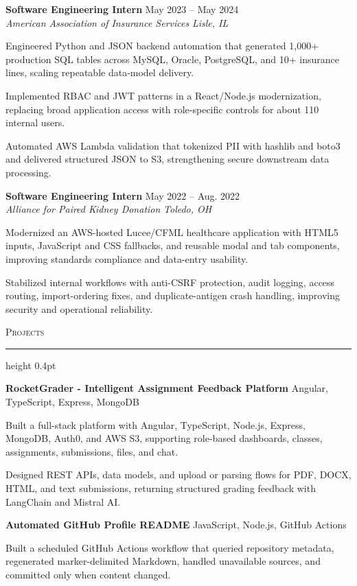 \documentclass[letterpaper,11pt]{article}
\newcommand{\resumesection}[1]{%
  \par\vspace{2pt}%
  {\large\scshape #1}\par\vspace{2pt}%
  \hrule height 0.4pt\vspace{2pt}%
}
\newcommand{\resumeSubheading}[4]{
  \textbf{#1} \hfill #2\\
  \textit{#3} \hfill \textit{#4}
}
\newcommand{\projectHeading}[2]{
  \textbf{#1} \hfill #2
}
\begin{document}
\resumeSubheading
{Software Engineering Intern}{May 2023 -- May 2024}
{American Association of Insurance Services}{Lisle, IL}
\begin{tightitemize}
  \item Engineered Python and JSON backend automation that generated 1,000+ production SQL tables across MySQL, Oracle, PostgreSQL, and 10+ insurance lines, scaling repeatable data-model delivery.
  \item Implemented RBAC and JWT patterns in a React/Node.js modernization, replacing broad application access with role-specific controls for about 110 internal users.
  \item Automated AWS Lambda validation that tokenized PII with hashlib and boto3 and delivered structured JSON to S3, strengthening secure downstream data processing.
\end{tightitemize}

\resumeSubheading
{Software Engineering Intern}{May 2022 -- Aug. 2022}
{Alliance for Paired Kidney Donation}{Toledo, OH}
\begin{tightitemize}
  \item Modernized an AWS-hosted Lucee/CFML healthcare application with HTML5 inputs, JavaScript and CSS fallbacks, and reusable modal and tab components, improving standards compliance and data-entry usability.
  \item Stabilized internal workflows with anti-CSRF protection, audit logging, access routing, import-ordering fixes, and duplicate-antigen crash handling, improving security and operational reliability.
\end{tightitemize}

\resumesection{Projects}
\projectHeading{RocketGrader - Intelligent Assignment Feedback Platform}{Angular, TypeScript, Express, MongoDB}
\begin{tightitemize}
  \item Built a full-stack platform with Angular, TypeScript, Node.js, Express, MongoDB, Auth0, and AWS S3, supporting role-based dashboards, classes, assignments, submissions, files, and chat.
  \item Designed REST APIs, data models, and upload or parsing flows for PDF, DOCX, HTML, and text submissions, returning structured grading feedback with LangChain and Mistral AI.
\end{tightitemize}

\projectHeading{Automated GitHub Profile README}{JavaScript, Node.js, GitHub Actions}
\begin{tightitemize}
  \item Built a scheduled GitHub Actions workflow that queried repository metadata, regenerated marker-delimited Markdown, handled unavailable sources, and committed only when content changed.
\end{tightitemize}
\end{document}
